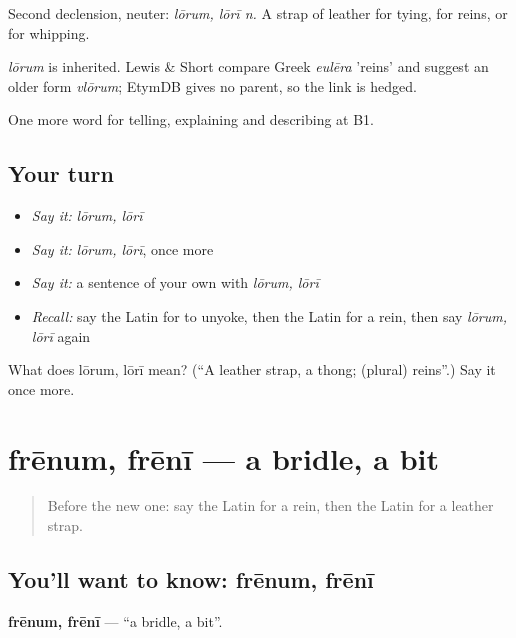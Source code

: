 Second declension, neuter: \emph{lōrum, lōrī n.} A strap of leather for tying, for reins, or for whipping.

\begin{cousinweb}
\emph{lōrum} is inherited. Lewis \& Short compare Greek \emph{eulēra} 'reins' and suggest an older form \emph{vlōrum}; EtymDB gives no parent, so the link is hedged.
\end{cousinweb}

\begin{grammarlens}[title={What you've built}]
One more word for telling, explaining and describing at B1.
\end{grammarlens}

\subsection*{Your turn}
\begin{itemize}
\raggedright
  \item \emph{Say it:} \emph{lōrum, lōrī}
  \item \emph{Say it:} \emph{lōrum, lōrī}, once more
  \item \emph{Say it:} a sentence of your own with \emph{lōrum, lōrī}
  \item \emph{Recall:} say the Latin for to unyoke, then the Latin for a rein, then say \emph{lōrum, lōrī} again
\end{itemize}

\begin{tcolorbox}[breakable,colback=teal!4,colframe=teal!35!black,title={Before you move on}]
What does lōrum, lōrī mean? (\textquotedblleft{}A leather strap, a thong; (plural) reins\textquotedblright{}.) Say it once more.
\end{tcolorbox}
\section[frēnum, frēnī]{frēnum, frēnī — a bridle, a bit}

\label{lesson:LA-C431-frenum}



\begin{quote}
Before the new one: say the Latin for a rein, then the Latin for a leather strap.
\end{quote}

\subsection*{You'll want to know: frēnum, frēnī}
\textbf{frēnum, frēnī} — \textquotedblleft{}a bridle, a bit\textquotedblright{}.

